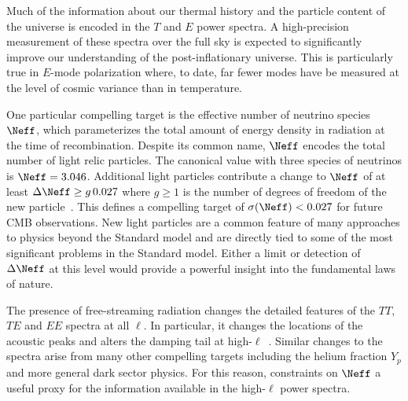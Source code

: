 Much of the information about our thermal history and the particle content of the universe is encoded in the $T$ and $E$ power spectra.  
A high-precision measurement of these spectra over the full sky is expected to significantly improve our understanding of the post-inflationary 
universe.  This is particularly true in $E$-mode polarization where, to date, far fewer modes have be measured at the level of cosmic variance than in temperature.

One particular compelling target is the effective number of neutrino species $\Neff$, which parameterizes the total amount of energy density in radiation 
at the time of recombination. Despite its common name, $\Neff$ encodes the total number of light relic particles.  The canonical value with three species of 
neutrinos is $\Neff = 3.046$. 
Additional light particles 
contribute a change to $\Neff$ of at least $\Delta \Neff \geq g \, 0.027$ where $g \geq 1$ is the number of degrees of freedom of the new particle~\cite{Brust:2013xpv,Baumann:2016wac}.  
This defines a compelling target of $\sigma(\Neff) < 0.027$ for future CMB observations.  New light particles are a common feature of many 
approaches to physics
beyond the Standard model and are directly tied to some of the most significant problems in the Standard model.  
Either a limit or detection of $\Delta \Neff$ at this level would provide a powerful insight into the fundamental laws of nature. 

The presence of free-streaming radiation changes the detailed features of the $TT$, $TE$ and $EE$ spectra at all $\ell$.  
In particular, it changes the locations of the acoustic peaks and alters the damping tail at high-$\ell$~\cite{Bashinsky:2003tk,Hou:2011ec,Follin:2015hya,Baumann:2015rya}.  Similar changes to the spectra 
arise from many other compelling targets including the helium fraction $Y_p$ and more general dark sector physics.  For this reason, 
constraints on $\Neff$ a useful proxy for the information available in the high-$\ell$ power spectra.  

